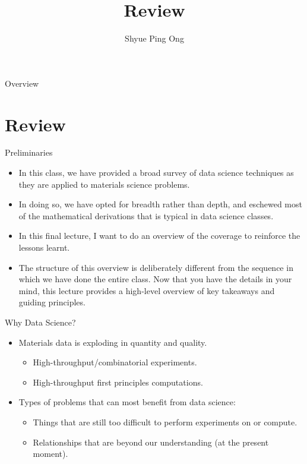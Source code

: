 \documentclass[aspectratio=169]{beamer}
\title[\classname Review]{\classname Review}
\author{Shyue Ping Ong}
\institute[UCSD]{University of California, San Diego\\
\medskip
}
\date{\classyear} %
\begin{document}
\begin{frame}
    \titlepage %
\end{frame}


\begin{frame}{Overview}
    \tableofcontents
\end{frame}


\section{Review}


\begin{frame}{Preliminaries}
    \begin{itemize}
        \item In this class, we have provided a broad survey of data science techniques as they are applied to materials science problems.
        \item In doing so, we have opted for breadth rather than depth, and eschewed most of the mathematical derivations that is typical in data science classes.
        \item In this final lecture, I want to do an overview of the coverage to reinforce the lessons learnt.
        \item The structure of this overview is deliberately different from the sequence in which we have done the entire class. Now that you have the details in your mind, this lecture provides a high-level overview of key takeaways and guiding principles.
    \end{itemize}
\end{frame}


\begin{frame}{Why Data Science?}
    \begin{itemize}
        \item Materials data is exploding in quantity and quality.
        \begin{itemize}
            \item High-throughput/combinatorial experiments.
            \item High-throughput first principles computations.
        \end{itemize}
        \item Types of problems that can most benefit from data science:
        \begin{itemize}
            \item Things that are still too difficult to perform experiments on or compute.
            \item Relationships that are beyond our understanding (at the present moment). 
        \end{itemize}
    \end{itemize}
\end{frame}
\end{document}

